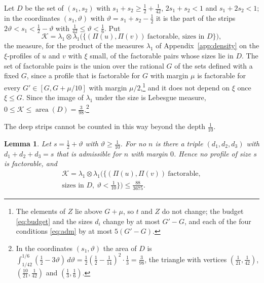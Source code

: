 \documentclass[aps,prd,twocolumn,superscriptaddress,nofootinbib,longbibliography,floatfix,showkeys,nobalancelastpage,amsmath,amssymb,10pt]{revtex4-2}
\theoremstyle{plain}
\newtheorem{lemma}[theorem]{Lemma}
\theoremstyle{definition}
\theoremstyle{plain}
\begin{document}
Let $D$ be the set of $(s_1,s_2)$ with $s_1+s_2\ge\frac12+\frac1{42}$, $2s_1+s_2<1$ and $s_1+2s_2<1$; in the coordinates $(s_1,\vartheta)$ with $\vartheta=s_1+s_2-\frac12$ it is the part of the strips $2\vartheta<s_1<\frac12-\vartheta$ with $\frac1{42}\le\vartheta<\frac16$. Put
\begin{equation}\label{eq:K}
\mathcal K=\lambda_1\otimes\lambda_1\bigl(\{(\Pi(u),\Pi(v))\ \text{factorable, sizes in }D\}\bigr),
\end{equation}
the measure, for the product of the measures $\lambda_1$ of Appendix~\ref{app:density} on the $\xi$-profiles of $u$ and $v$ with $\xi$ small, of the factorable pairs whose sizes lie in $D$. The set of factorable pairs is the union over the rational $G$ of the sets defined with a fixed $G$, since a profile that is factorable for $G$ with margin $\mu$ is factorable for every $G'\in[G,G+\mu/10]$ with margin $\mu/2$,\footnote{The elements of $Z$ lie above $G+\mu$, so $t$ and $Z$ do not change; the budget \eqref{eq:budget} and the sizes $d_i$ change by at most $G'-G$, and each of the four conditions \eqref{eq:adm} by at most $5(G'-G)$.} and it does not depend on $\xi$ once $\xi\le G$. Since the image of $\lambda_1$ under the size is Lebesgue measure, $0\le\mathcal K\le\operatorname{area}(D)=\frac3{98}$.\footnote{In the coordinates $(s_1,\vartheta)$ the area of $D$ is $\int_{1/42}^{1/6}(\frac12-3\vartheta)\,d\vartheta=\frac12(\frac12-\frac1{14})^2\cdot\frac13=\frac3{98}$, the triangle with vertices $(\frac1{21},\frac1{42})$, $(\frac{10}{21},\frac1{42})$ and $(\frac13,\frac16)$.}

The deep strips cannot be counted in this way beyond the depth $\frac1{10}$.

\begin{lemma}\label{lem:tenth}
Let $s=\frac12+\vartheta$ with $\vartheta\ge\frac1{10}$. For no $n$ is there a triple $(d_1,d_2,d_3)$ with $d_1+d_2+d_3=s$ that is admissible for $n$ with margin $0$. Hence no profile of size $s$ is factorable, and
\begin{multline*}
\mathcal K=\lambda_1\otimes\lambda_1\bigl(\{(\Pi(u),\Pi(v))\ \text{factorable},\\
\text{sizes in }D,\ \vartheta<\tfrac1{10}\}\bigr)\le\frac{88}{3675}.
\end{multline*}
\end{lemma}
\end{document}
